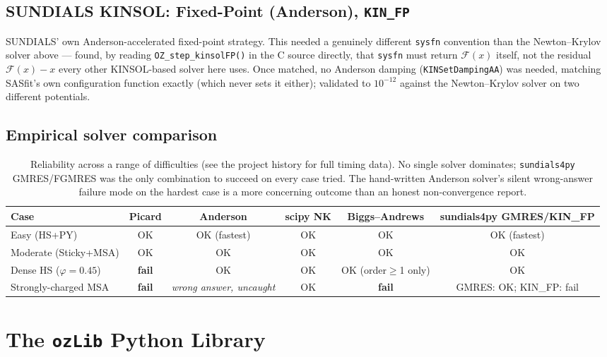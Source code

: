 \documentclass[11pt,a4paper]{article}
\newcommand{\code}[1]{\texttt{#1}}
\begin{document}
\subsection{SUNDIALS KINSOL: Fixed-Point (Anderson), \code{KIN\_FP}}
SUNDIALS' own Anderson-accelerated fixed-point strategy. This needed a
genuinely different \code{sysfn} convention than the Newton--Krylov solver
above --- found, by reading \code{OZ\_step\_kinsolFP()} in the C source
directly, that \code{sysfn} must return $\mathcal{F}(x)$ itself, not the
residual $\mathcal{F}(x)-x$ every other KINSOL-based solver here uses. Once
matched, no Anderson damping (\code{KINSetDampingAA}) was needed, matching
SASfit's own configuration function exactly (which never sets it either);
validated to $10^{-12}$ against the Newton--Krylov solver on two different
potentials.

\subsection{Empirical solver comparison}
\label{sec:solver-comparison}

\begin{table}[h]
\centering
\small
\begin{tabular}{lccccc}
\toprule
Case & Picard & Anderson & scipy NK & Biggs--Andrews & \parbox{2.2cm}{\centering sundials4py GMRES/KIN\_FP} \\
\midrule
Easy (HS+PY) & OK & OK (fastest) & OK & OK & OK (fastest) \\
Moderate (Sticky+MSA) & OK & OK & OK & OK & OK \\
Dense HS ($\varphi{=}0.45$) & \textbf{fail} & OK & OK & OK (order$\ge$1 only) & OK \\
Strongly-charged MSA & \textbf{fail} & \emph{wrong answer, uncaught} & OK & \textbf{fail} & GMRES: OK; KIN\_FP: fail \\
\bottomrule
\end{tabular}
\caption{Reliability across a range of difficulties (see the project history
for full timing data). No single solver dominates; \code{sundials4py} GMRES/FGMRES
was the only combination to succeed on every case tried. The hand-written
Anderson solver's silent wrong-answer failure mode on the hardest case is a
more concerning outcome than an honest non-convergence report.}
\end{table}

\clearpage
\section{The \code{ozLib} Python Library}
\label{sec:ozlib}
\end{document}
